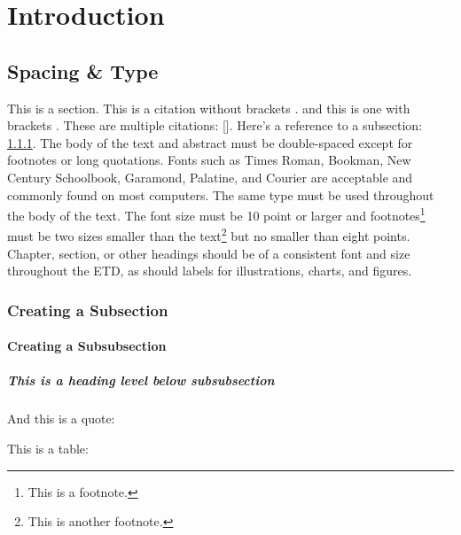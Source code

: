 
\chapter{Introduction}
\label{chap:intro}

\section{Spacing \& Type}
\label{sec:section}

This is a section. This is a citation without brackets . and this is one with brackets \cite{A}. These are multiple citations: []. Here's a reference to a subsection: \ref{sec:subsection}. The body of the text and abstract must be double-spaced except for footnotes or long quotations. Fonts such as Times Roman, Bookman, New Century Schoolbook, Garamond, Palatine, and Courier are acceptable and commonly found on most computers. The same type must be used throughout the body of the text. The font size must be 10 point or larger and footnotes\footnote{This is a footnote.} must be two sizes smaller than the text\footnote{This is another footnote.} but no smaller than eight points. Chapter, section, or other headings should be of a consistent font and size throughout the ETD, as should labels for illustrations, charts, and figures.  

\subsection{Creating a Subsection}
\label{sec:subsection}

\subsubsection{Creating a Subsubsection}

\paragraph{This is a heading level below subsubsection}

And this is a quote: 
%
\begin{quote}
\blindtext
\end{quote}

This is a table:
\makeatletter
\let\@currsize\normalsize
\makeatother

